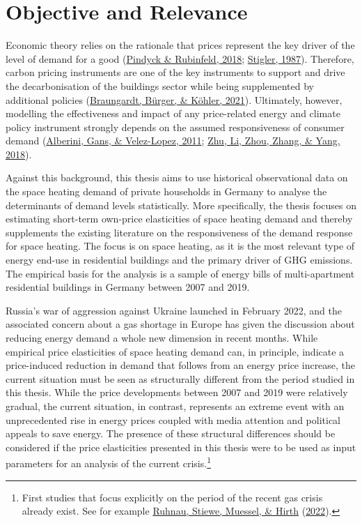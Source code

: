 \documentclass[12pt,twoside]{reedthesis}
\begin{document}
\hypertarget{relevance}{%
\section{Objective and Relevance}\label{relevance}}

Economic theory relies on the rationale that prices represent the key driver of the level of demand for a good (\protect\hyperlink{ref-pindyck_rubinfeld18}{Pindyck \& Rubinfeld, 2018}; \protect\hyperlink{ref-stigler87}{Stigler, 1987}). Therefore, carbon pricing instruments are one of the key instruments to support and drive the decarbonisation of the buildings sector while being supplemented by additional policies (\protect\hyperlink{ref-braungardt_etal21}{Braungardt, Bürger, \& Köhler, 2021}). Ultimately, however, modelling the effectiveness and impact of any price-related energy and climate policy instrument strongly depends on the assumed responsiveness of consumer demand (\protect\hyperlink{ref-alberini_etal11}{Alberini, Gans, \& Velez-Lopez, 2011}; \protect\hyperlink{ref-zhu_etal18}{Zhu, Li, Zhou, Zhang, \& Yang, 2018}).

Against this background, this thesis aims to use historical observational data on the space heating demand of private households in Germany to analyse the determinants of demand levels statistically. More specifically, the thesis focuses on estimating short-term own-price elasticities of space heating demand and thereby supplements the existing literature on the responsiveness of the demand response for space heating. The focus is on space heating, as it is the most relevant type of energy end-use in residential buildings and the primary driver of GHG emissions. The empirical basis for the analysis is a sample of energy bills of multi-apartment residential buildings in Germany between 2007 and 2019.

Russia's war of aggression against Ukraine launched in February 2022, and the associated concern about a gas shortage in Europe has given the discussion about reducing energy demand a whole new dimension in recent months. While empirical price elasticities of space heating demand can, in principle, indicate a price-induced reduction in demand that follows from an energy price increase, the current situation must be seen as structurally different from the period studied in this thesis. While the price developments between 2007 and 2019 were relatively gradual, the current situation, in contrast, represents an extreme event with an unprecedented rise in energy prices coupled with media attention and political appeals to save energy. The presence of these structural differences should be considered if the price elasticities presented in this thesis were to be used as input parameters for an analysis of the current crisis.\footnote{First studies that focus explicitly on the period of the recent gas crisis already exist. See for example \protect\hyperlink{ref-Ruhnau2022demand}{Ruhnau, Stiewe, Muessel, \& Hirth} (\protect\hyperlink{ref-Ruhnau2022demand}{2022}).}
\end{document}
